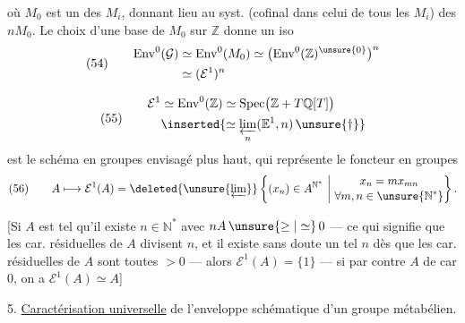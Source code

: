 

où $M_0$ est un des $M_i$, donnant lieu
au syst. (cofinal dans celui de tous les
$M_i$) des $nM_0$. Le choix d'une
base de $M_0$ sur $\mathbb{Z}$ donne un
iso
\[
(54)\qquad
\begin{aligned}
\operatorname{Env}^{0}(\mathcal{G})
&\simeq \operatorname{Env}^{0}(M_0)
\simeq \bigl(\operatorname{Env}^{0}(\mathbb{Z})^{\unsure{0}}\bigr)^n\\
&\simeq(\mathcal{E}^{1})^n
\end{aligned}
\]


\[
(55)\qquad
\begin{aligned}
\mathcal{E}^{1}
&\simeq \operatorname{Env}^{0}(\mathbb{Z})
\simeq\operatorname{Spec}\bigl(\mathbb{Z}+T\mathbb{Q}[T]\bigr)\\
&\inserted{\simeq\varprojlim_n(\mathbb{E}^{1},n)\,\unsure{\dagger}}
\end{aligned}
\]
est le schéma en groupes envisagé plus
haut, qui représente le foncteur en groupes
\[
(56)\qquad
A\longmapsto\mathcal{E}^{1}(A)
=\deleted{\unsure{\varprojlim}}
\left\{(x_n)\in A^{\mathbb{N}^{*}}\ \middle|\
\begin{gathered}
x_n=mx_{mn}\\[-2pt]
\forall m,n\in\unsure{\mathbb{N}^{*}}
\end{gathered}
\right\}.
\]

[Si $A$ est tel qu'il existe $n\in\mathbb{N}^{*}$ avec
$nA\,\unsure{\geq|\simeq}\,0$ ---
ce qui signifie
que les car. résiduelles de $A$ divisent $n$,
et  il existe sans doute un tel $n$
dès que les car. résiduelles de $A$ sont
toutes $>0$ --- alors $\mathcal{E}^{1}(A)=\{1\}$ ---
si par contre $A$ de car $0$, on a $\mathcal{E}^{1}(A)\simeq A$]



5. \uline{Caractérisation universelle} de l'enveloppe schématique d'un groupe métabélien.

